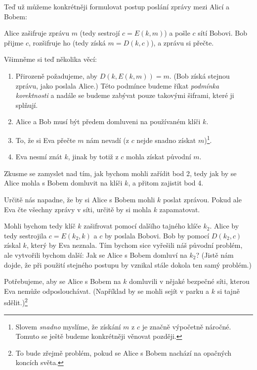 \documentclass[
  program=infoi,
  biblatex,
  figures=false,
  glossaries,
  index
]{kidiplom}
\begin{document}
    \medskip

    Teď už můžeme konkrétněji formulovat postup poslání zprávy mezi Alicí a Bobem:

    Alice zašifruje zprávu $m$ (tedy sestrojí $c=E(k,m)$) a pošle $c$ sítí Bobovi.
    Bob přijme $c$, rozšifruje ho (tedy získá $m=D(k,c)$), a zprávu si přečte.

    \medskip

    Všimněme si teď několika věcí:
    
    \begin{enumerate}
        \item
            Přirozeně požadujeme, aby $D(k, E(k, m))=m$.
            (Bob získá stejnou zprávu, jako poslala Alice.)
            Této podmínce budeme říkat \emph{podmínka korektnosti} a nadále se budeme
            zabývat pouze takovými šiframi, které ji splňují.
        \item
            Alice a Bob musí být předem domluveni na používaném klíči $k$.
        \item
            To, že si Eva přečte $m$ nám nevadí (z $c$ nejde snadno získat $m$)\footnote{Slovem \emph{snadno} myslíme, že získání
            $m$ z $c$ je značně výpočetně náročné. Tomuto se ještě budeme konkrétněji věnovat později.}.
        \item
            Eva nesmí znát $k$, jinak by totiž z $c$ mohla získat původní $m$.
    \end{enumerate}

    Zkusme se zamyslet nad tím, jak bychom mohli zařídit bod 2, tedy jak by se Alice mohla s Bobem
    domluvit na klíči $k$, a přitom zajistit bod 4.

    \medskip

    Určitě nás napadne, že by si Alice s Bobem mohli $k$ poslat zprávou.
    Pokud ale Eva čte všechny zprávy v síti, určitě by si mohla $k$ zapamatovat.

    Mohli bychom tedy klíč $k$ zašifrovat pomocí dalšího tajného klíče $k_2$.
    Alice by tedy sestrojila $c = E(k_2, k)$ a $c$ by poslala Bobovi.
    Bob by pomocí $D(k_2, c)$ získal $k$, který by Eva neznala.
    Tím bychom sice vyřešili náš původní problém, ale vytvořili bychom další: Jak se Alice s Bobem domluví
    na $k_2$? (Jistě nám dojde, že při použití stejného postupu by vznikal stále dokola ten samý problém.)
    
    Potřebujeme, aby se Alice s Bobem na $k$ domluvili v nějaké bezpečné síti, kterou Eva nemůže odposlouchávat.
    (Například by se mohli sejít v parku a $k$ si tajně sdělit.)\footnote{To bude zřejmě problém, pokud se Alice s Bobem
    nachází na opačných koncích světa.}
\end{document}
